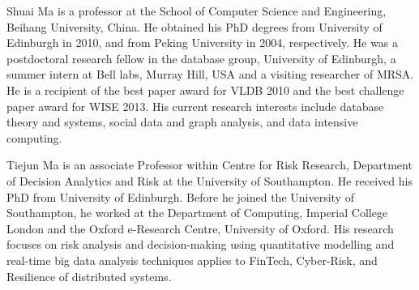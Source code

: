 \begin{IEEEbiography}{Shuai Ma} is a professor at the School of Computer Science and Engineering, Beihang University, China.
He obtained his PhD degrees from University of Edinburgh in 2010, and from
Peking University in 2004, respectively.
He was a postdoctoral research fellow in the database group, University of Edinburgh, a summer intern at Bell labs, Murray Hill, USA and a visiting researcher of MRSA.
He is a recipient of the best paper award for VLDB 2010 and the best challenge paper award for WISE 2013. His current research interests include database theory and systems, social data and graph analysis, and data intensive computing.
\end{IEEEbiography}
\vspace{-8ex}
\begin{IEEEbiography}{Tiejun Ma} is an associate Professor within Centre for Risk Research, Department of Decision Analytics and Risk at the University of Southampton. He received his PhD from University of Edinburgh. Before he joined the University of Southampton, he worked at the Department of Computing, Imperial College London and the Oxford e-Research Centre, University of Oxford. His research focuses on risk analysis and decision-making using quantitative modelling and real-time big data analysis techniques applies to FinTech, Cyber-Risk, and Resilience of distributed systems.
\end{IEEEbiography}
\vspace{-8ex}
